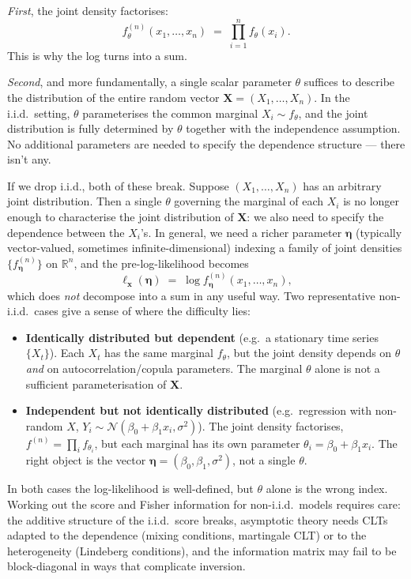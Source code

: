 \documentclass[a4paper,oneside,12pt]{extarticle}
\theoremstyle{plain}
\theoremstyle{definition}
\theoremstyle{remark}
\begin{document}
\emph{First}, the joint density factorises:
\[
  f_\theta^{(n)}(x_1,\ldots,x_n) \;=\; \prod_{i=1}^n f_\theta(x_i).
\]
This is why the log turns into a sum.

\emph{Second}, and more fundamentally, a single scalar parameter
$\theta$ suffices to describe the distribution of the entire random
vector $\mathbf{X} = (X_1,\ldots,X_n)$.  In the i.i.d.\ setting,
$\theta$ parameterises the common marginal $X_i \sim f_\theta$, and
the joint distribution is fully determined by $\theta$ together
with the independence assumption.  No additional parameters are
needed to specify the dependence structure --- there isn't any.

If we drop i.i.d., both of these break.  Suppose
$(X_1,\ldots,X_n)$ has an arbitrary joint distribution.  Then a
single $\theta$ governing the marginal of each $X_i$ is no longer
enough to characterise the joint distribution of $\mathbf{X}$: we
also need to specify the dependence between the $X_i$'s.  In
general, we need a richer parameter
$\boldsymbol{\eta}$ (typically vector-valued, sometimes
infinite-dimensional) indexing a family of joint densities
$\{f_{\boldsymbol{\eta}}^{(n)}\}$ on $\mathbb{R}^n$, and the
pre-log-likelihood becomes
\[
  \ell_{\mathbf{x}}(\boldsymbol{\eta})
  \;=\; \log f_{\boldsymbol{\eta}}^{(n)}(x_1,\ldots,x_n),
\]
which does \emph{not} decompose into a sum in any useful way.  Two
representative non-i.i.d.\ cases give a sense of where the difficulty
lies:

\begin{itemize}
\item \textbf{Identically distributed but dependent} (e.g.\ a
  stationary time series $\{X_t\}$).  Each $X_t$ has the same
  marginal $f_\theta$, but the joint density depends on
  $\theta$ \emph{and} on autocorrelation/copula parameters.  The
  marginal $\theta$ alone is not a sufficient parameterisation of
  $\mathbf{X}$.

\item \textbf{Independent but not identically distributed}
  (e.g.\ regression with non-random $X$, $Y_i \sim
  \mathcal{N}(\beta_0 + \beta_1 x_i, \sigma^2)$).  The joint
  density factorises, $f^{(n)} = \prod_i f_{\theta_i}$, but each
  marginal has its own parameter $\theta_i = \beta_0 + \beta_1 x_i$.
  The right object is the vector $\boldsymbol{\eta} =
  (\beta_0,\beta_1,\sigma^2)$, not a single $\theta$.
\end{itemize}

In both cases the log-likelihood is well-defined, but
$\theta$ alone is the wrong index.  Working out the score and
Fisher information for non-i.i.d.\ models requires care:
the additive structure of the i.i.d.\ score breaks, asymptotic
theory needs CLTs adapted to the dependence (mixing conditions,
martingale CLT) or to the heterogeneity (Lindeberg conditions),
and the information matrix may fail to be block-diagonal in ways
that complicate inversion.
\end{document}
